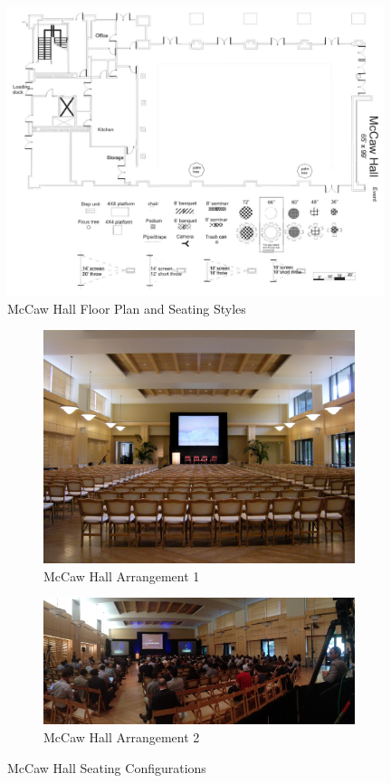 \documentclass[11pt]{article}
\begin{document}
\begin{figure}
  \centering
  \includegraphics[width=0.98\textwidth]{fig/fpmccaw}
  \caption{McCaw Hall Floor Plan and Seating Styles}
  \label{fig:mccaw-fp}
\end{figure}

\begin{figure}
\centering
\begin{subfigure}{.5\textwidth}
  \centering
  \includegraphics[width=.9\linewidth]{fig/mccawtheatre}
  \caption{McCaw Hall Arrangement 1}
  \label{fig:mccaw-theatre1}
\end{subfigure}%
\begin{subfigure}{.5\textwidth}
  \centering
  \includegraphics[width=.9\linewidth]{fig/mccawtheatre2}
  \caption{McCaw Hall Arrangement 2}
  \label{fig:mccaw-theatre2}
\end{subfigure}
\caption{McCaw Hall Seating Configurations}
\label{fig:mccaw-seating}
\end{figure}
\end{document}
